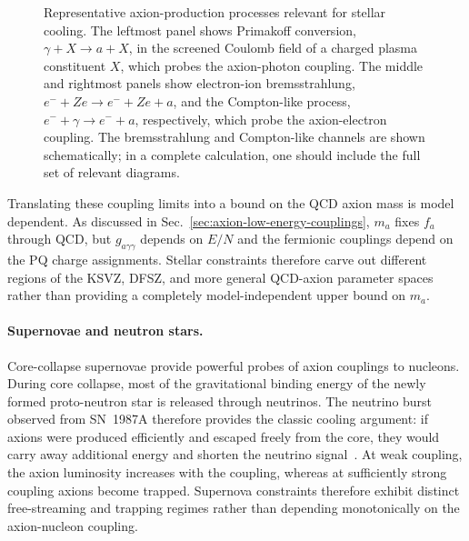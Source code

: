 \documentclass[review]{elsarticle}
\numberwithin{equation}{section}
\numberwithin{table}{section}
\numberwithin{figure}{section}
\begin{document}
\begin{figure}[t]
\begin{minipage}{0.32\textwidth}
    \end{minipage}
    \caption{Representative axion-production processes relevant for stellar cooling. The leftmost panel shows Primakoff conversion, $\gamma+X\rightarrow a+X$, in the screened Coulomb field of a charged plasma constituent $X$, which probes the axion-photon coupling. The middle and rightmost panels show electron-ion bremsstrahlung, $e^-+Ze\rightarrow e^-+Ze+a$, and the Compton-like process, $e^-+\gamma\rightarrow e^-+a$, respectively, which probe the axion-electron coupling. The bremsstrahlung and Compton-like channels are shown schematically; in a complete calculation, one should include the full set of relevant diagrams.}
    \label{fig:stellar-axion-processes}
\end{figure}

Translating these coupling limits into a bound on the QCD axion mass is model dependent. As discussed in Sec.~\ref{sec:axion-low-energy-couplings}, $m_a$ fixes $f_a$ through QCD, but $g_{a\gamma\gamma}$ depends on $E/N$ and the fermionic couplings depend on the PQ charge assignments. Stellar constraints therefore carve out different regions of the KSVZ, DFSZ, and more general QCD-axion parameter spaces rather than providing a completely model-independent upper bound on $m_a$.

\paragraph{Supernovae and neutron stars.}

Core-collapse supernovae provide powerful probes of axion couplings to nucleons. During core collapse, most of the gravitational binding energy of the newly formed proto-neutron star is released through neutrinos. The neutrino burst observed from SN~1987A therefore provides the classic cooling argument: if axions were produced efficiently and escaped freely from the core, they would carry away additional energy and shorten the neutrino signal~\cite{Raffelt:1987yt,Turner:1987by,Mayle:1987as}. At weak coupling, the axion luminosity increases with the coupling, whereas at sufficiently strong coupling axions become trapped. Supernova constraints therefore exhibit distinct free-streaming and trapping regimes rather than depending monotonically on the axion-nucleon coupling. 
\end{document}
